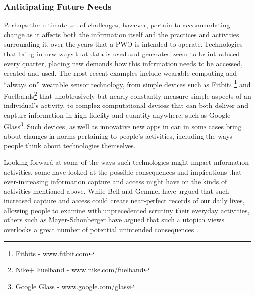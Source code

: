 \documentclass{acm_proc_article-sp}
\begin{document}
\subsubsection{Anticipating Future Needs}
Perhaps the ultimate set of challenges, however, pertain to accommodating change as it affects both the information itself and the practices and activities surrounding it, over the years that a PWO is intended to operate.  Technologies that bring in new ways that data is used and generated seem to be introduced every quarter, placing new demands how this information needs to be accessed, created and used.  The most recent examples include wearable computing and ``always on'' wearable sensor technology, from simple devices such as Fitbits \footnote{Fitbits - \url{www.fitbit.com}} and Fuelbands\footnote{Nike+ Fuelband - \url{www.nike.com/fuelband}} that unobtrusively but nearly constantly measure simple aspects of an individual's activity, to complex computational devices that can both deliver and capture information in high fidelity and quantity anywhere, such as Google Glass\footnote{Google Glass - \url{www.google.com/glass}}.  Such devices, as well as innovative new apps in can in some cases bring about changes in norms pertaining to people's activities, including the ways people think about technologies themselves.


Looking forward at some of the ways such technologies might impact information activities, some have looked at the possible consequences and implications that ever-increasing information capture and access might have on the kinds of activities mentioned above. While Bell and Gemmel have argued \cite{bell2010total} that such increased capture and access could create near-perfect records of our daily lives, allowing people to examine with unprecedented scrutiny their everyday activities, others such as Mayer-Schonberger have argued that such a utopian views overlooks a great number of potential unintended consequences \cite{mayer-schonberger2013}.  

\end{document}
